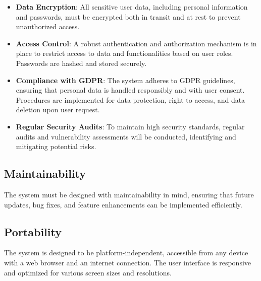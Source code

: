 \begin{itemize}
    \item \textbf{Data Encryption}: All sensitive user data, including personal information and passwords, must be encrypted both in transit and at rest to prevent unauthorized access.
    \item \textbf{Access Control}: A robust authentication and authorization mechanism is in place to restrict access to data and functionalities based on user roles. Passwords are hashed and stored securely.
    \item \textbf{Compliance with GDPR}: The system adheres to GDPR guidelines, ensuring that personal data is handled responsibly and with user consent. Procedures are implemented for data protection, right to access, and data deletion upon user request.
    \item \textbf{Regular Security Audits}: To maintain high security standards, regular audits and vulnerability assessments will be conducted, identifying and mitigating potential risks.
\end{itemize}


\subsection{Maintainability}
The system must be designed with maintainability in mind, ensuring that future updates, bug fixes, and feature enhancements can be implemented efficiently.
\subsection{Portability}
The system is designed to be platform-independent, accessible from any device with a web browser and an internet connection. The user interface is responsive and optimized for various screen sizes and resolutions.